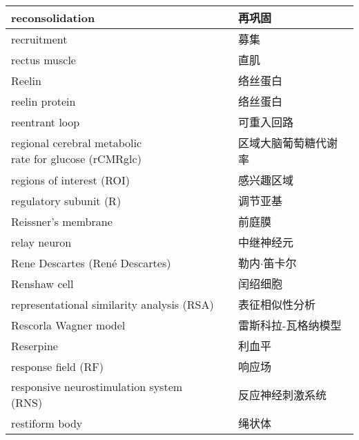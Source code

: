 \begin{longtable}{lll}
	\midrule
	reconsolidation   && 再巩固  \\
	
	\midrule
	recruitment   && 募集  \\
	
	\midrule
	rectus muscle   && 直肌  \\
	
	\midrule
	Reelin   && 络丝蛋白  \\
	
	\midrule
	reelin protein   && 络丝蛋白  \\
	
	\midrule
	reentrant loop   && 可重入回路  \\
	
	\midrule
	\makecell[l]{regional cerebral metabolic \\rate for glucose (rCMRglc)}  && 区域大脑葡萄糖代谢率  \\
	
	\midrule
	regions of interest (ROI)   && 感兴趣区域  \\
	
	\midrule
	regulatory subunit (R)   && 调节亚基  \\
	
	\midrule
	Reissner’s membrane   && 前庭膜  \\
	
	\midrule
	relay neuron   && 中继神经元  \\
	
	\midrule
	Rene Descartes (René Descartes)  && 勒内$\cdot$笛卡尔  \\
	
	\midrule
	Renshaw cell   && 闰绍细胞  \\
	
	\midrule
	representational similarity analysis (RSA)  && 表征相似性分析  \\
	
	\midrule
	Rescorla Wagner model   && 雷斯科拉-瓦格纳模型  \\
	
	\midrule
	Reserpine   && 利血平  \\
	
	\midrule
	response field (RF)   && 响应场  \\
	
	\midrule
	responsive neurostimulation system (RNS)   && 反应神经刺激系统  \\
	
	\midrule
	restiform body   && 绳状体  \\
	

\end{longtable}

